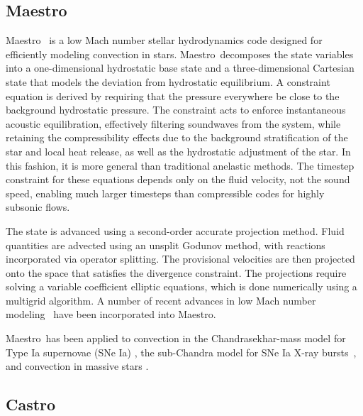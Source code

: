 \documentclass[a4paper]{jpconf}
\newcommand{\maestro}{{\sffamily Maestro}}
\newcommand{\castro}{{\sffamily Castro}}
\begin{document}
\subsection{\maestro}

\maestro~\cite{MAESTRO:Multilevel} is a low Mach number stellar
hydrodynamics code designed for efficiently modeling convection in
stars.  \maestro\ decomposes the state variables into a one-dimensional
hydrostatic base state and a three-dimensional Cartesian state that
models the deviation from hydrostatic equilibrium.
A constraint equation is derived by
requiring that the pressure everywhere be close to the background
hydrostatic pressure.  The constraint acts to enforce instantaneous
acoustic equilibration, effectively filtering soundwaves from the
system, while retaining the compressibility effects due to the
background stratification of the star and local heat release, as well
as the hydrostatic adjustment of the star.  In this fashion, it is
more general than traditional anelastic methods.  The timestep
constraint for these equations depends only on the fluid velocity, not
the sound speed, enabling much larger timesteps than compressible
codes for highly subsonic flows.

The state is advanced using a second-order accurate projection method.
Fluid quantities are advected using an unsplit Godunov method, with
reactions incorporated via operator splitting.  The provisional
velocities are then projected onto the space that satisfies the
divergence constraint.  The projections require solving a variable
coefficient elliptic equations, which is done numerically using a
multigrid algorithm.  A number of recent advances in low Mach
number modeling~\cite{kleinpauluis,vasil:2013} have been
incorporated into \maestro.

\maestro\ has been applied to convection in the Chandrasekhar-mass
model for Type Ia supernovae (SNe Ia)
\cite{ZABNW:IV,wdconvect,wdturb}, the sub-Chandra model for SNe Ia
\cite{subchandra,subchandra2} X-ray bursts~\cite{xrb,xrb2,xrb3}, and
convection in massive stars \cite{ms_cc}.



\subsection{\castro}
\end{document}
